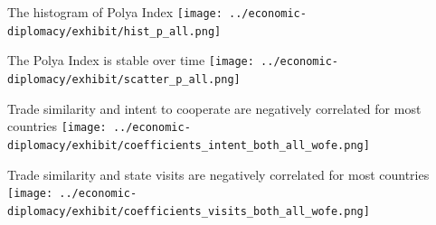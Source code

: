 \documentclass[
  ignorenonframetext,
  aspectratio=16,
]{beamer}
\begin{document}
\begin{frame}{The histogram of Polya Index}
\protect\hypertarget{the-histogram-of-polya-index}{}
\texttt{[image: ../economic-diplomacy/exhibit/hist\_p\_all.png]}
\end{frame}

\begin{frame}{The Polya Index is stable over time}
\protect\hypertarget{the-polya-index-is-stable-over-time}{}
\texttt{[image: ../economic-diplomacy/exhibit/scatter\_p\_all.png]}
\end{frame}

\begin{frame}{Trade similarity and intent to cooperate are negatively
correlated for most countries}
\protect\hypertarget{trade-similarity-and-intent-to-cooperate-are-negatively-correlated-for-most-countries}{}
\texttt{[image: ../economic-diplomacy/exhibit/coefficients\_intent\_both\_all\_wofe.png]}
\end{frame}

\begin{frame}{Trade similarity and state visits are negatively
correlated for most countries}
\protect\hypertarget{trade-similarity-and-state-visits-are-negatively-correlated-for-most-countries}{}
\texttt{[image: ../economic-diplomacy/exhibit/coefficients\_visits\_both\_all\_wofe.png]}
\end{frame}
\end{document}
